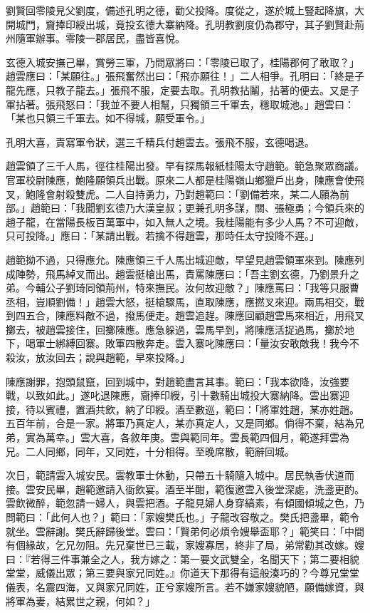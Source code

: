 劉賢回零陵見父劉度，備述孔明之德，勸父投降。度從之，遂於城上豎起降旗，大開城門，齎捧印綬出城，竟投玄德大寨納降。孔明教劉度仍為郡守，其子劉賢赴荊州隨軍辦事。零陵一郡居民，盡皆喜悅。

玄德入城安撫己畢，賞勞三軍，乃問眾將曰：「零陵已取了，桂陽郡何了敢取？」趙雲應曰：「某願往。」張飛奮然出曰：「飛亦願往！」二人相爭。孔明曰：「終是子龍先應，只教子龍去。」張飛不服，定要去取。孔明教拈鬮，拈著的便去。又是子軍拈著。張飛怒曰：「我並不要人相幫，只獨領三千軍去，穩取城池。」趙雲曰：「某也只領三千軍去。如不得城，願受軍令。」

孔明大喜，責寫軍令狀，選三千精兵付趙雲去。張飛不服，玄德喝退。

趙雲領了三千人馬，徑往桂陽出發。早有探馬報紙桂陽太守趙範。範急聚眾商議。官軍校尉陳應，鮑隆願領兵出戰。原來二人都是桂陽嶺山鄉獵戶出身，陳應會使飛叉，鮑隆會射殺雙虎。二人自持勇力，乃對趙範曰：「劉備若來，某二人願為前部。」趙範曰：「我聞劉玄德乃大漢皇叔；更兼孔明多謀，關、張極勇；今領兵來的趙子龍，在當陽長板百萬軍中，如入無人之境。我桂陽能有多少人馬？不可迎敵，只可投降。」應曰：「某請出戰。若擒不得趙雲，那時任太守投降不遲。」

趙範拗不過，只得應允。陳應領三千人馬出城迎敵，早望見趙雲領軍來到。陳應列成陣勢，飛馬綽叉而出。趙雲挺槍出馬，責罵陳應曰：「吾主劉玄德，乃劉景升之弟。今輔公子劉琦同領荊州，特來撫民。汝何故迎敵？」陳應罵曰：「我等只服曹丞相，豈順劉備！」趙雲大怒，挺槍驟馬，直取陳應，應撚叉來迎。兩馬相交，戰到四五合，陳應料敵不過，撥馬便走。趙雲追趕。陳應回顧趙雲馬來相近，用飛叉擲去，被趙雲接住，回擲陳應。應急躲過，雲馬早到，將陳應活捉過馬，擲於地下，喝軍士綁縛回寨。敗軍四散奔走。雲入寨叱陳應曰：「量汝安敢敵我！我今不殺汝，放汝回去；說與趙範，早來投降。」

陳應謝罪，抱頭鼠竄，回到城中，對趙範盡言其事。範曰：「我本欲降，汝強要戰，以致如此。」遂叱退陳應，齎捧印綬，引十數騎出城投大寨納降。雲出寨迎接，待以賓禮，置酒共飲，納了印綬。酒至數巡，範曰：「將軍姓趙，某亦姓趙。五百年前，合是一家。將軍乃真定人，某亦真定人，又是同鄉。倘得不棄，結為兄弟，實為萬幸。」雲大喜，各敘年庚。雲與範同年。雲長範四個月，範遂拜雲為兄。二人同鄉，同年，又同姓，十分相得。至晚席散，範辭回城。

次日，範請雲入城安民。雲教軍士休動，只帶五十騎隨入城中。居民執香伏道而接。雲安民畢，趙範邀請入衙飲宴。酒至半酣，範復邀雲入後堂深處，洗盞更酌。雲飲微醉，範忽請一婦人，與雲把酒。子龍見婦人身穿縞素，有傾國傾城之色，乃問範曰：「此何人也？」範曰：「家嫂樊氏也。」子龍改容敬之。樊氏把盞畢，範令就坐。雲辭謝。樊氏辭歸後堂。雲曰：「賢弟何必煩令嫂舉盃耶？」範笑曰：「中間有個緣故，乞兄勿阻。先兄棄世已三載，家嫂寡居，終非了局，弟常勸其改嫁。嫂曰：『若得三件事兼全之人，我方嫁之：第一要文武雙全，名聞天下；第二要相貌堂堂，威儀出眾；第三要與家兄同姓。』你道天下那得有這般湊巧的？今尊兄堂堂儀表，名震四海，又與家兄同姓，正兮家嫂所言。若不嫌家嫂貌陋，願備嫁資，與將軍為妻，結累世之親，何如？」

